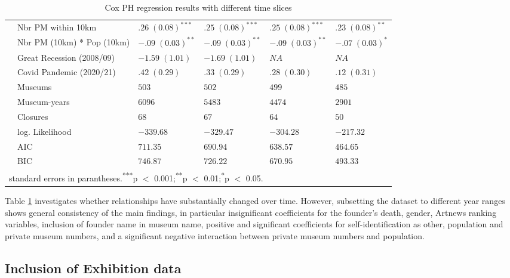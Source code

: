 \documentclass[12pt]{article}
\begin{document}
\begin{table}[ht]
\begin{tabular}{p{0mm}lllll}
   & Nbr PM within 10km & $.26 \; (0.08)^{***}$ & $.25 \; (0.08)^{***}$ & $.25 \; (0.08)^{***}$ & $.23 \; (0.08)^{**}$ \\ 
   & Nbr PM (10km) * Pop (10km) & $-.09 \; (0.03)^{**}$ & $-.09 \; (0.03)^{**}$ & $-.09 \; (0.03)^{**}$ & $-.07 \; (0.03)^{*}$ \\ 
   & Great Recession (2008/09) & $-1.59 \; (1.01)$ & $-1.69 \; (1.01)$ & $NA$ & $NA$ \\ 
   & Covid Pandemic (2020/21) & $.42 \; (0.29)$ & $.33 \; (0.29)$ & $.28 \; (0.30)$ & $.12 \; (0.31)$ \\ 
   \hline
 & Museums & $503$ & $502$ & $499$ & $485$ \\ 
   & Museum-years & $6096$ & $5483$ & $4474$ & $2901$ \\ 
   & Closures & $68$ & $67$ & $64$ & $50$ \\ 
   & log. Likelihood & $-339.68$ & $-329.47$ & $-304.28$ & $-217.32$ \\ 
   & AIC & $711.35$ & $690.94$ & $638.57$ & $464.65$ \\ 
   & BIC & $746.87$ & $726.22$ & $670.95$ & $493.33$ \\ 
   \hline 
 \multicolumn{6}{l}{\footnotesize{standard errors in parantheses.\textsuperscript{***}p $<$ 0.001;\textsuperscript{**}p $<$ 0.01;\textsuperscript{*}p $<$ 0.05.}}
\end{tabular}
\caption{Cox PH regression results with different time slices} 
\label{tbl:t_reg_coxph_timeslice}
\end{table}

Table \ref{tbl:t_reg_coxph_timeslice} investigates whether relationships have substantially changed over time.
However, subsetting the dataset to different year ranges shows general consistency of the main findings, in particular insignificant coefficients for the founder's death, gender, Artnews ranking variables, inclusion of founder name in museum name, positive and significant coefficients for self-identification as other, population and private museum numbers, and a significant negative interaction between private museum numbers and population.
\subsection*{Inclusion of Exhibition data}
\label{sec:org3423df8}
\end{document}

